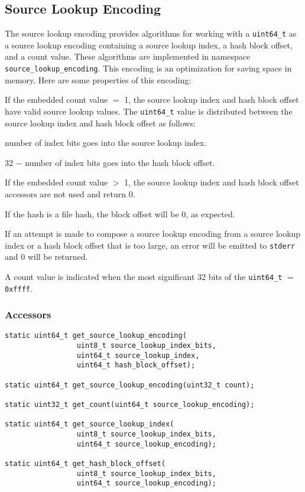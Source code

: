 \documentclass[12pt,twoside]{article}
\begin{document}
\subsection{Source Lookup Encoding}
The source lookup encoding provides algorithms for working with a
\texttt{uint64\_t}
as a source lookup encoding containing a source lookup index,
a hash block offset, and a count value.
These algorithms are
implemented in namespace \texttt{source\_lookup\_encoding}.
This encoding is an optimization for saving space in memory.
Here are some properties of this encoding:
\begin{compactitem}
\item If the embedded count value $=$ 1,
the source lookup index and hash block offset
have valid source lookup values.
The \texttt{uint64\_t} value is distributed between the
source lookup index and hash block offset as follows:
  \begin{compactitem}
  \item number of index bits goes into the source lookup index.
  \item 32 $-$ number of index bits goes into the hash block offset.
  \end{compactitem}
\item If the embedded count value $>$ 1,
the source lookup index and hash block offset accessors
are not used and return 0.
\item If the hash is a file hash, the block offset will be 0, as expected.
\item If an attempt is made to compose a source lookup encoding
from a source lookup index or a hash block offset
that is too large, an error will be emitted to \texttt{stderr}
and 0 will be returned.
\item A count value is indicated when the most significant 32 bits
of the \texttt{uint64\_t} $=$ \texttt{0xffff}.
\end{compactitem}

\subsubsection{Accessors}
\begin{small}
\begin{verbatim}
static uint64_t get_source_lookup_encoding(
                 uint8_t source_lookup_index_bits,
                 uint64_t source_lookup_index,
                 uint64_t hash_block_offset);

static uint64_t get_source_lookup_encoding(uint32_t count);

static uint32_t get_count(uint64_t source_lookup_encoding);

static uint64_t get_source_lookup_index(
                 uint8_t source_lookup_index_bits,
                 uint64_t source_lookup_encoding);

static uint64_t get_hash_block_offset(
                 uint8_t source_lookup_index_bits,
                 uint64_t source_lookup_encoding);
\end{verbatim}
\end{small}
\end{document}
